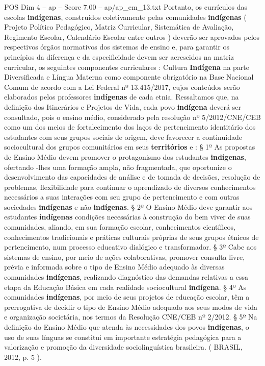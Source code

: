 \begin{textsample}{POS Dim 4 – ap – Score 7.00 – ap/ap\_em\_13.txt}
Portanto, os currículos das escolas \textbf{indígenas}, construídos coletivamente pelas comunidades \textbf{indígenas} ( Projeto Político Pedagógico, Matriz Curricular, Sistemática de Avaliação, Regimento Escolar, Calendário Escolar entre outros ) deverão ser aprovados pelos respectivos órgãos normativos dos sistemas de ensino e, para garantir os princípios da diferença e da especificidade devem ser acrescidos na matriz curricular, os seguintes componentes curriculares : Cultura \textbf{Indígena} na parte Diversificada e Língua Materna como componente obrigatório na Base Nacional Comum de acordo com a Lei Federal nº 13.415/2017, cujos conteúdos serão elaborados pelos professores \textbf{indígenas} de cada etnia.
Ressaltamos que, na definição dos Itinerários e Projetos de Vida, cada povo \textbf{indígena} deverá ser consultado, pois o ensino médio, considerado pela resolução nº 5/2012/CNE/CEB como um dos meios de fortalecimento dos laços de pertencimento identitário dos estudantes com seus grupos sociais de origem, deve favorecer a continuidade sociocultural dos grupos comunitários em seus \textbf{territórios} e : § 1º As propostas de Ensino Médio devem promover o protagonismo dos estudantes \textbf{indígenas}, ofertando -lhes uma formação ampla, não fragmentada, que oportunize o desenvolvimento das capacidades de análise e de tomada de decisões, resolução de problemas, flexibilidade para continuar o aprendizado de diversos conhecimentos necessários a suas interações com seu grupo de pertencimento e com outras sociedades \textbf{indígenas} e não \textbf{indígenas}. § 2º O Ensino Médio deve garantir aos estudantes \textbf{indígenas} condições necessárias à construção do bem viver de suas comunidades, aliando, em sua formação escolar, conhecimentos científicos, conhecimentos tradicionais e práticas culturais próprias de seus grupos étnicos de pertencimento, num processo educativo dialógico e transformador. § 3º Cabe aos sistemas de ensino, por meio de ações colaborativas, promover consulta livre, prévia e informada sobre o tipo de Ensino Médio adequado às diversas comunidades \textbf{indígenas}, realizando diagnóstico das demandas relativas a essa etapa da Educação Básica em cada realidade sociocultural \textbf{indígena}. § 4º As comunidades \textbf{indígenas}, por meio de seus projetos de educação escolar, têm a prerrogativa de decidir o tipo de Ensino Médio adequado aos seus modos de vida e organização societária, nos termos da Resolução CNE/CEB nº 2/2012. § 5º Na definição do Ensino Médio que atenda às necessidades dos povos \textbf{indígenas}, o uso de suas línguas se constitui em importante estratégia pedagógica para a valorização e promoção da diversidade sociolinguística brasileira. ( BRASIL, 2012, p. 5 ).

\end{textsample}
